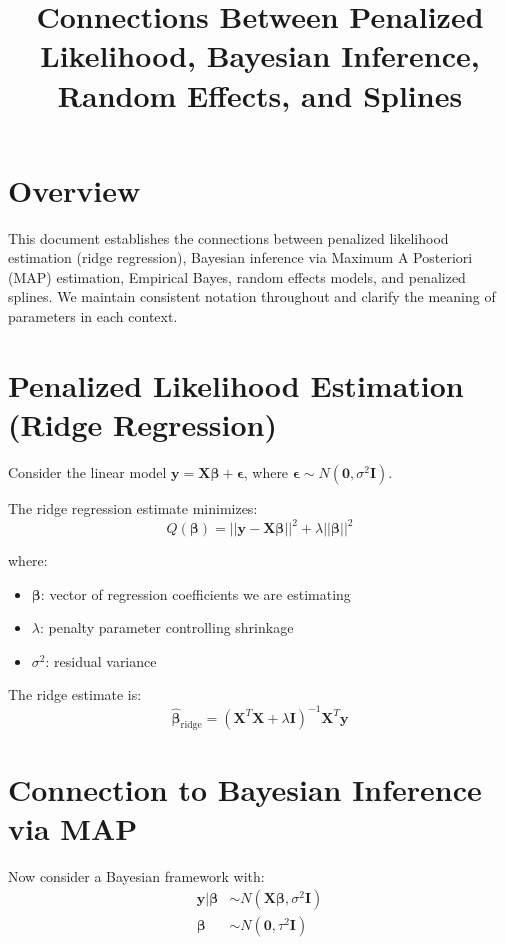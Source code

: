 \documentclass[11pt]{article}
\title{Connections Between Penalized Likelihood, Bayesian Inference, Random Effects, and Splines}
\author{}
\date{}
\begin{document}
\maketitle

\section{Overview}
This document establishes the connections between penalized likelihood estimation (ridge regression), Bayesian inference via Maximum A Posteriori (MAP) estimation, Empirical Bayes, random effects models, and penalized splines. We maintain consistent notation throughout and clarify the meaning of parameters in each context.

\section{Penalized Likelihood Estimation (Ridge Regression)}

Consider the linear model $\mathbf{y} = \mathbf{X}\boldsymbol{\beta} + \boldsymbol{\epsilon}$, where $\boldsymbol{\epsilon} \sim N(\mathbf{0}, \sigma^2\mathbf{I})$.

The ridge regression estimate minimizes:
\begin{equation}
Q(\boldsymbol{\beta}) = ||\mathbf{y} - \mathbf{X}\boldsymbol{\beta}||^2 + \lambda||\boldsymbol{\beta}||^2
\end{equation}

where:
\begin{itemize}
    \item $\boldsymbol{\beta}$: vector of regression coefficients we are estimating
    \item $\lambda$: penalty parameter controlling shrinkage
    \item $\sigma^2$: residual variance
\end{itemize}

The ridge estimate is:
\begin{equation}
\hat{\boldsymbol{\beta}}_{\text{ridge}} = (\mathbf{X}^T\mathbf{X} + \lambda\mathbf{I})^{-1}\mathbf{X}^T\mathbf{y}
\end{equation}

\section{Connection to Bayesian Inference via MAP}

Now consider a Bayesian framework with:
\begin{align}
\mathbf{y}|\boldsymbol{\beta} &\sim N(\mathbf{X}\boldsymbol{\beta}, \sigma^2\mathbf{I}) \\
\boldsymbol{\beta} &\sim N(\mathbf{0}, \tau^2\mathbf{I})
\end{align}
\end{document}
